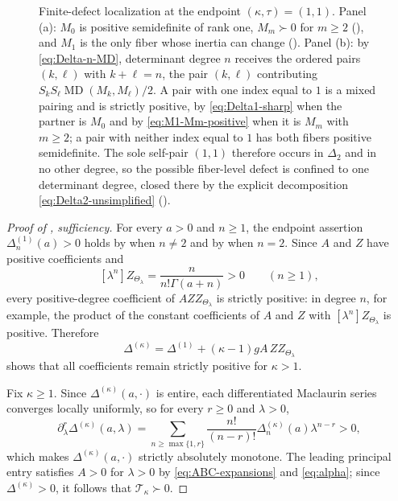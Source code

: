 \documentclass[11pt,a4paper]{amsart}
\numberwithin{equation}{section}
\theoremstyle{plain}
\theoremstyle{definition}
\newcommand{\MD}{\operatorname{MD}}
\newcommand{\Turan}{\mathcal T}
\newcommand{\Thetal}{\Theta_{\lambda}}
\begin{document}
\begin{figure}[ht]
\caption{Finite-defect localization at the endpoint \((\kappa,\tau)=(1,1)\).
Panel (a): \(M_0\) is positive semidefinite of rank one, \(M_m\succ0\) for
\(m\ge2\) (), and \(M_1\) is the only fiber whose inertia can
change ().  Panel (b): by \eqref{eq:Delta-n-MD},
determinant degree \(n\) receives the ordered pairs \((k,\ell)\) with
\(k+\ell=n\), the pair \((k,\ell)\) contributing
\(S_kS_\ell\MD(M_k,M_\ell)/2\).  A pair with one index equal to \(1\) is a
mixed pairing and is strictly positive, by \eqref{eq:Delta1-sharp} when the
partner is \(M_0\) and by \eqref{eq:M1-Mm-positive} when it is \(M_m\) with
\(m\ge2\); a pair with neither index equal to \(1\) has both fibers positive
semidefinite.  The sole self-pair \((1,1)\) therefore occurs in \(\Delta_2\)
and in no other degree, so the possible fiber-level defect is confined to one
determinant degree, closed there by the explicit decomposition
\eqref{eq:Delta2-unsimplified} ().}
\label{fig:defect-localization}
\end{figure}

\begin{proof}[Proof of , sufficiency]
For every \(a>0\) and \(n\ge1\), the endpoint assertion \(\Delta_n^{(1)}(a)>0\) holds
by  when \(n\ne2\) and by  when
\(n=2\).  Since \(A\) and \(Z\) have positive coefficients and
\[
 [\lambda^n]Z_{\Thetal}=\frac{n}{n!\Gamma(a+n)}>0\qquad(n\ge1),
\]
every positive-degree coefficient of \(AZZ_{\Thetal}\) is strictly positive: in
degree \(n\), for example, the product of the constant coefficients of \(A\) and
\(Z\) with \([\lambda^n]Z_{\Thetal}\) is positive.  Therefore
\[
 \Delta^{(\kappa)}
 =\Delta^{(1)}+(\kappa-1)gA\,ZZ_{\Thetal}
\]
shows that all coefficients remain strictly positive for \(\kappa>1\).

Fix \(\kappa\ge1\).  Since \(\Delta^{(\kappa)}(a,\cdot)\) is entire, each differentiated Maclaurin series converges locally uniformly, so for every \(r\ge0\) and \(\lambda>0\),
\[
 \partial_\lambda^r\Delta^{(\kappa)}(a,\lambda)
 =\sum_{n\ge\max\{1,r\}}
 \frac{n!}{(n-r)!}\Delta_n^{(\kappa)}(a)\lambda^{n-r}>0,
\]
which makes \(\Delta^{(\kappa)}(a,\cdot)\) strictly absolutely monotone.  The leading principal entry satisfies \(A>0\) for \(\lambda>0\) by \eqref{eq:ABC-expansions} and \eqref{eq:alpha}; since \(\Delta^{(\kappa)}>0\), it follows that \(\Turan_\kappa\succ0\).
\end{proof}
\end{document}
